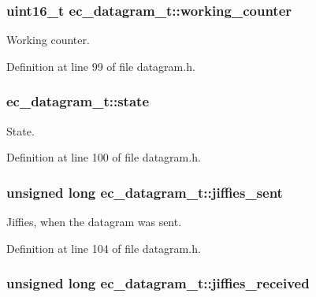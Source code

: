 \subsubsection[{working\-\_\-counter}]{\setlength{\rightskip}{0pt plus 5cm}uint16\-\_\-t ec\-\_\-datagram\-\_\-t\-::working\-\_\-counter}\label{structec__datagram__t_a1eeebb1d33d0dbf47498dd78a966977d}


Working counter. 



Definition at line 99 of file datagram.\-h.

\subsubsection[{state}]{ ec\-\_\-datagram\-\_\-t\-::state}\label{structec__datagram__t_a90d55e568be4b8464e9725c105d6c4b0}


State. 



Definition at line 100 of file datagram.\-h.

\subsubsection[{jiffies\-\_\-sent}]{\setlength{\rightskip}{0pt plus 5cm}unsigned long ec\-\_\-datagram\-\_\-t\-::jiffies\-\_\-sent}\label{structec__datagram__t_a640ba704d00d50c33e930b6c641b55d7}


Jiffies, when the datagram was sent. 



Definition at line 104 of file datagram.\-h.

\subsubsection[{jiffies\-\_\-received}]{\setlength{\rightskip}{0pt plus 5cm}unsigned long ec\-\_\-datagram\-\_\-t\-::jiffies\-\_\-received}\label{structec__datagram__t_a3a643445750ee67fa83d182eb720380e}


